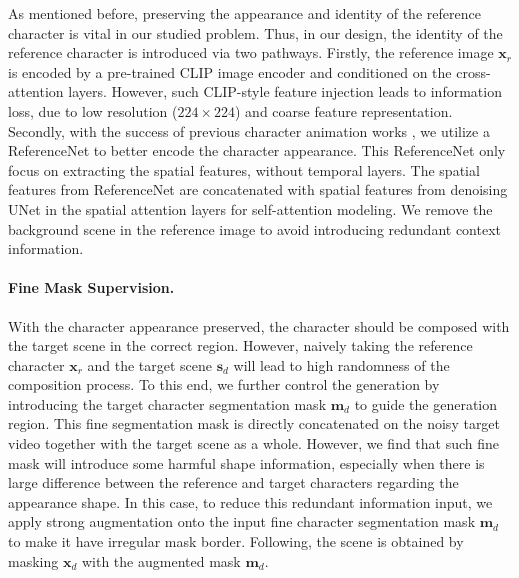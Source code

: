 As mentioned before, preserving the appearance and identity of the reference character is vital in our studied problem.
Thus, in our design, the identity of the reference character is introduced via two pathways.
Firstly, the reference image $\boldsymbol{x}_r$ is encoded by a pre-trained CLIP \cite{radford2021learning} image encoder and conditioned on the cross-attention layers.
However, such CLIP-style feature injection leads to information loss, due to low resolution ($224 \times 224$) and coarse feature representation.
Secondly, with the success of previous character animation works \cite{hu2024animate,xu2024magicanimate}, we utilize a ReferenceNet to better encode the character appearance.
This ReferenceNet only focus on extracting the spatial features, without temporal layers.
The spatial features from ReferenceNet are concatenated with spatial features from denoising UNet in the spatial attention layers for self-attention modeling.
We remove the background scene in the reference image to avoid introducing redundant context information.





\paragraph{Fine Mask Supervision.}
With the character appearance preserved, the character should be composed with the target scene in the correct region.
However, naively taking the reference character $\boldsymbol{x}_r$ and the target scene $\boldsymbol{s}_d$ will lead to high randomness of the composition process.
To this end, we further control the generation by introducing the target character segmentation mask $\boldsymbol{m}_d$ to guide the generation region.
This fine segmentation mask is directly concatenated on the noisy target video together with the target scene as a whole.
However, we find that such fine mask will introduce some harmful shape information, especially when there is large difference between the reference and target characters regarding the appearance shape.
In this case, to reduce this redundant information input, we apply strong augmentation onto the input fine character segmentation mask $\boldsymbol{m}_d$ to make it have irregular mask border.
Following, the scene is obtained by masking $\boldsymbol{x}_d$ with the augmented mask $\boldsymbol{m}_d$.



